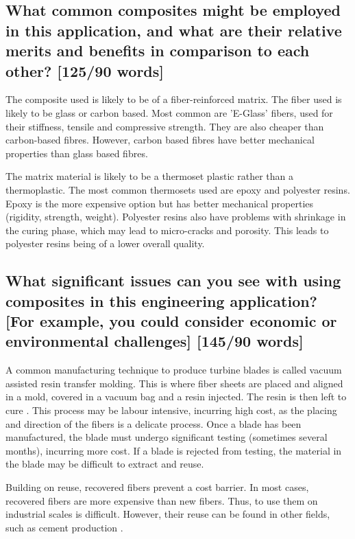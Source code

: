 \documentclass[12pt]{article}
\numberwithin{equation}{section}
\begin{document}
\begin{flushleft}
\subsection[Common composites, relative advantages.]{What common composites might be employed in this application, and what are their relative merits and benefits in comparison to each other? [125/90 words]}
The composite used is likely to be of a fiber-reinforced matrix. The fiber used is likely to be glass or carbon based. Most common are 'E-Glass' fibers, used for their stiffness, tensile and compressive strength. They are also cheaper than carbon-based fibres. However, carbon based fibres have better mechanical properties than glass based fibres. 

The matrix material is likely to be a thermoset plastic rather than a thermoplastic. The most common thermosets used are epoxy and polyester resins. Epoxy is the more expensive option but has better mechanical properties (rigidity, strength, weight). Polyester resins also have problems with shrinkage in the curing phase, which may lead to micro-cracks and porosity. This leads to polyester resins being of a lower overall quality.

\subsection[Issues with composites.]{What significant issues can you see with using composites in this engineering application? [For 
example, you could consider economic or environmental
challenges] [145/90 words]}
A common manufacturing technique to produce turbine blades is called vacuum assisted resin transfer molding. This is where fiber sheets are placed and aligned in a mold, covered in a vacuum bag and a resin injected. The resin is then left to cure \citep{VARTM}. This process may be labour intensive, incurring high cost, as the placing and direction of the fibers is a delicate process. Once a blade has been manufactured, the blade must undergo significant testing (sometimes several months), incurring more cost. If a blade is rejected from testing, the material in the blade may be difficult to extract and reuse. 

Building on reuse, recovered fibers prevent a cost barrier. In most cases, recovered fibers are more expensive than new fibers. Thus, to use them on industrial scales is difficult. However, their reuse can be found in other fields, such as cement production \citep{fiberCement}.


\end{flushleft}
\end{document}

